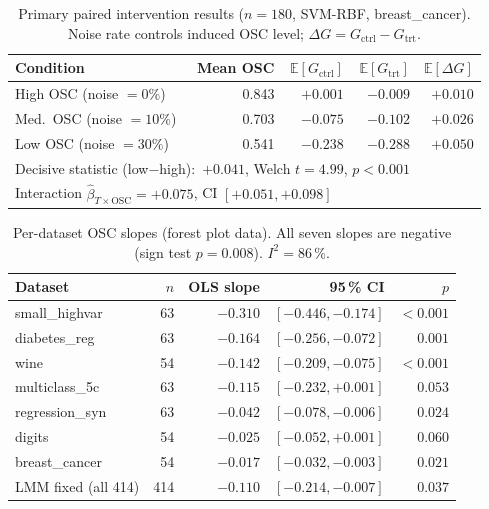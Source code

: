 \documentclass[twoside]{article}
\newcommand{\bE}{\mathbb{E}}
\begin{document}
\begin{table}[h]
\centering
\caption{Primary paired intervention results ($n=180$, SVM-RBF,
breast\_cancer). Noise rate controls induced OSC level;
$\Delta G = G_{\mathrm{ctrl}} - G_{\mathrm{trt}}$.}
\label{tab:intervention}
\begin{tabular}{lrrrr}
\toprule
Condition & Mean OSC & $\bE[G_\mathrm{ctrl}]$ & $\bE[G_\mathrm{trt}]$ & $\bE[\Delta G]$ \\
\midrule
High OSC (noise $=0\%$)  & 0.843 & $+0.001$ & $-0.009$ & $+0.010$ \\
Med.\ OSC (noise $=10\%$) & 0.703 & $-0.075$ & $-0.102$ & $+0.026$ \\
Low OSC (noise $=30\%$)  & 0.541 & $-0.238$ & $-0.288$ & $+0.050$ \\
\midrule
\multicolumn{4}{l}{Decisive statistic (low$-$high):\ $+0.041$, Welch $t=4.99$, $p<0.001$} \\
\multicolumn{4}{l}{Interaction $\hat\beta_{T\times\mathrm{OSC}}=+0.075$, CI $[+0.051,+0.098]$} \\
\bottomrule
\end{tabular}
\end{table}

\begin{table}[h]
\centering
\caption{Per-dataset OSC slopes (forest plot data). All seven slopes are
negative (sign test $p=0.008$). $I^2=86\,\%$.}
\label{tab:forest}
\begin{tabular}{lrrrr}
\toprule
Dataset & $n$ & OLS slope & 95\,\% CI & $p$ \\
\midrule
small\_highvar & 63 & $-0.310$ & $[-0.446, -0.174]$ & ${<}0.001$ \\
diabetes\_reg  & 63 & $-0.164$ & $[-0.256, -0.072]$ & $0.001$ \\
wine           & 54 & $-0.142$ & $[-0.209, -0.075]$ & ${<}0.001$ \\
multiclass\_5c & 63 & $-0.115$ & $[-0.232, +0.001]$ & $0.053$ \\
regression\_syn & 63 & $-0.042$ & $[-0.078, -0.006]$ & $0.024$ \\
digits         & 54 & $-0.025$ & $[-0.052, +0.001]$ & $0.060$ \\
breast\_cancer  & 54 & $-0.017$ & $[-0.032, -0.003]$ & $0.021$ \\
\midrule
LMM fixed (all 414) & 414 & $-0.110$ & $[-0.214, -0.007]$ & $0.037$ \\
\bottomrule
\end{tabular}
\end{table}
\end{document}
